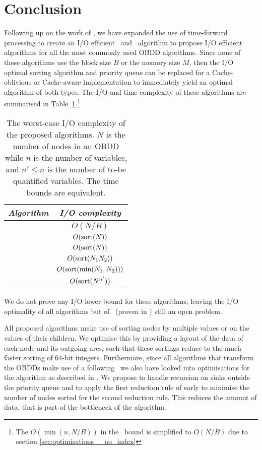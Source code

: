 \section{Conclusion} \label{sec:conclusion}
Following up on the work of \cite{Arge96}, we have expanded the use of
time-forward processing to create an I/O efficient \Reduce\ and \Apply\
algorithm to propose I/O efficient algorithms for all the most commonly used
OBDD algorithms. Since none of these algorithms use the block size $B$ or the
memory size $M$, then the I/O optimal sorting algorithm and priority queue can
be replaced for a Cache-oblivious or Cache-aware implementation to immediately
yield an optimal algorithm of both types. The I/O and time complexity of these
algorithms are summarised in Table~\ref{tab:summary_efficiency}.\footnote{The
  $O(\min(n, N/B))$ in the \Evaluate\ bound is simplified to $O(N/B)$ due to
  section \ref{sec:optimisations__no_index}}

\begin{table}[ht!]
  \centering
  \begin{tabular}{c | c}
    \emph{Algorithm} & \emph{I/O complexity}
    \\ \hline \hline
    \Evaluate & $O(N/B)$
    \\
    \Reduce & $O(\text{sort}(N))$
    \\
    \Restrict & $O(\text{sort}(N))$
    \\
    \Apply & $O(\text{sort}(N_1 N_2))$
    \\
    \Isomorphic & $O(\text{sort}(\min(N_1, N_2)))$
    \\
    \Exists & $O(\text{sort}(N^{n'}))$
  \end{tabular}
  \caption{The worst-case I/O complexity of the proposed algorithms. $N$ is the
    number of nodes in an OBDD while $n$ is the number of variables, and $n'
    \leq n$ is the number of to-be quantified variables. The time bounds are
    equivalent.}
  \label{tab:summary_efficiency}
\end{table}

We do not prove any I/O lower bound for these algorithms, leaving the I/O
optimality of all algorithms but of \Reduce\ (proven in \cite{Arge96}) still an
open problem.

All proposed algorithms make use of sorting nodes by multiple values or on the
values of their children. We optimise this by providing a layout of the data of
each node and its outgoing arcs, such that these sortings reduce to the much
faster sorting of $64$-bit integers. Furthermore, since all algorithms that
transform the OBDDs make use of a following \Reduce\ we also have looked into
optimisations for the algorithm as described in \cite{Arge96}. We propose to
handle recursion on sinks outside the priority queue and to apply the first
reduction rule of \cite{Bryant86} early to minimise the number of nodes sorted
for the second reduction rule. This reduces the amount of data, that is part of
the bottleneck of the algorithm.

